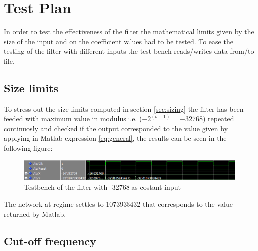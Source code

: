 \section{Test Plan}
In order to test the effectiveness of the filter the mathematical limits given by the size of the input and on the coefficient values had to be tested.
To ease the testing of the filter with different inputs the test bench reads/writes data from/to file.
\subsection{Size limits}
To stress out the size limits computed in section \ref{sec:sizing} the filter has been feeded with maximum value in modulus i.e. ($-2^(b-1)= -32768 $) repeated continuosly and checked if the output corresponded to the value given by applying in Matlab expression \ref{eq:general}, the results can be seen in the following figure:
\begin{figure}[H]
  \centering
  \includegraphics[width=0.9\linewidth]{./images/simul32768.PNG}
  \caption{Testbench of the filter with -32768 as costant input}
  \label{fig:32768}
\end{figure}
The network at regime settles to 1073938432 that corresponds to the value returned by Matlab.
\subsection{Cut-off frequency}